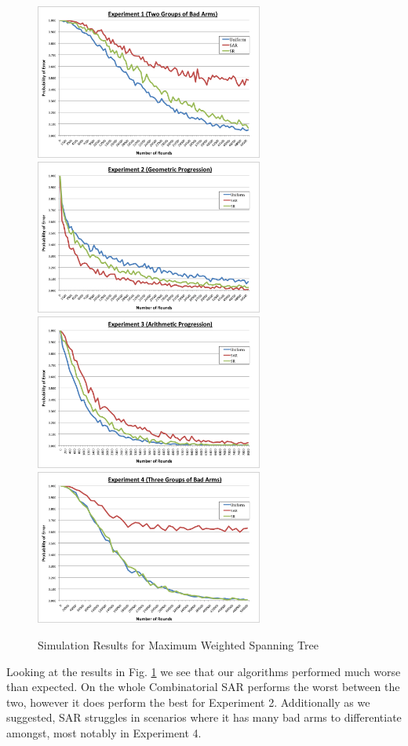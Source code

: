 \documentclass[11.75pt,oneside]{amsart}
\begin{document}
\begin{figure}[ht]

\includegraphics[width=75mm]{Experiment1.png}
\includegraphics[width=75mm]{Experiment2.png}
\includegraphics[width=75mm]{Experiment3.png}
\includegraphics[width=75mm]{Experiment4.png}
\caption{\label{experiments} Simulation Results for Maximum Weighted Spanning Tree}
\end{figure}

Looking at the results in Fig. \ref{experiments} we see that our algorithms performed much worse than expected. On the whole Combinatorial SAR performs the worst between the two, however it does perform the best for Experiment 2. Additionally as we suggested, SAR struggles in scenarios where it has many bad arms to differentiate amongst, most notably in Experiment 4.\\
\end{document}
